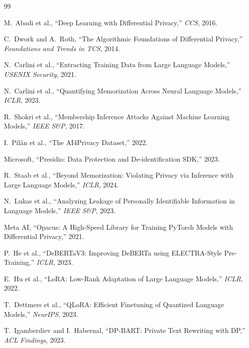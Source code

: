 \documentclass[11pt, a4paper]{article}
\begin{document}
\newpage
\begin{thebibliography}{99}

M.~Abadi et al., ``Deep Learning with Differential Privacy,'' \textit{CCS}, 2016.

C.~Dwork and A.~Roth, ``The Algorithmic Foundations of Differential Privacy,'' \textit{Foundations and Trends in TCS}, 2014.

N.~Carlini et al., ``Extracting Training Data from Large Language Models,'' \textit{USENIX Security}, 2021.

N.~Carlini et al., ``Quantifying Memorization Across Neural Language Models,'' \textit{ICLR}, 2023.

R.~Shokri et al., ``Membership Inference Attacks Against Machine Learning Models,'' \textit{IEEE S\&P}, 2017.

I.~Pil\'{a}n et al., ``The AI4Privacy Dataset,'' 2022.

Microsoft, ``Presidio: Data Protection and De-identification SDK,'' 2023.

R.~Staab et al., ``Beyond Memorization: Violating Privacy via Inference with Large Language Models,'' \textit{ICLR}, 2024.

N.~Lukas et al., ``Analyzing Leakage of Personally Identifiable Information in Language Models,'' \textit{IEEE S\&P}, 2023.

Meta AI, ``Opacus: A High-Speed Library for Training PyTorch Models with Differential Privacy,'' 2021.

P.~He et al., ``DeBERTaV3: Improving DeBERTa using ELECTRA-Style Pre-Training,'' \textit{ICLR}, 2023.

E.~Hu et al., ``LoRA: Low-Rank Adaptation of Large Language Models,'' \textit{ICLR}, 2022.

T.~Dettmers et al., ``QLoRA: Efficient Finetuning of Quantized Language Models,'' \textit{NeurIPS}, 2023.

T.~Igamberdiev and I.~Habernal, ``DP-BART: Private Text Rewriting with DP,'' \textit{ACL Findings}, 2023.


\end{thebibliography}
\end{document}

